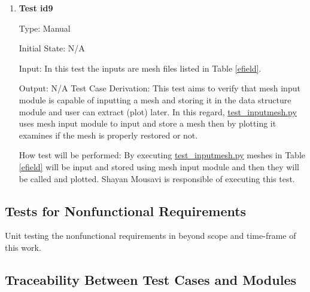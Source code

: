 \documentclass[12pt, titlepage]{article}
\begin{document}
\begin{enumerate}


\item{\textbf{Test id9}\\}

Type: Manual

Initial State: N/A

Input: In this test the inputs are mesh files listed in Table \ref{efield}.

Output: N/A 
Test Case Derivation: This test aims to verify that mesh input module is capable of inputting a mesh and storing it in the data structure module and user can extract (plot) later. In this regard, \href{https://github.com/shmouses/SPDFM/tree/master/src/test_inputmesh.py}{test\_inputmesh.py} uses mesh input module to input and store a mesh then by plotting it examines if the mesh is properly restored or not. 

How test will be performed:  By executing \href{https://github.com/shmouses/SPDFM/tree/master/src/test_inputmesh.py}{test\_inputmesh.py} meshes in Table \ref{efield} will be input and stored using mesh input module and then they will be called and plotted. Shayan Mousavi is responsible of executing this test.  
	
\end{enumerate}





\subsection{Tests for Nonfunctional Requirements}

Unit testing the nonfunctional requirements in beyond scope and time-frame of this work.


\subsection{Traceability Between Test Cases and Modules}
\end{document}
